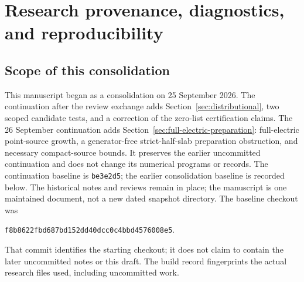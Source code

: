 \section{Research provenance, diagnostics, and reproducibility}\label{app:provenance}
\subsection{Scope of this consolidation}
This manuscript began as a consolidation on 25 September 2026.
The continuation after the review exchange adds
Section~\ref{sec:distributional}, two scoped candidate tests,
and a correction of the zero-list certification claims.
The 26 September continuation adds
Section~\ref{sec:full-electric-preparation}: full-electric point-source
growth, a generator-free strict-half-slab preparation obstruction, and
necessary compact-source bounds. It preserves the earlier uncommitted
continuation and does not change its numerical programs or records.
The continuation baseline is \texttt{be3e2d5}; the earlier
consolidation baseline is recorded below. The historical notes
and reviews remain in place; the manuscript is one
maintained document, not a new dated snapshot directory.
The baseline checkout was
\begin{center}\small
\texttt{f8b8622fbd687bd152dd40dcc0c4bbd4576008e5}.
\end{center}
That commit identifies the starting checkout; it does not
claim to contain the later uncommitted notes or this draft.
The build record fingerprints the actual research files
used, including uncommitted work.

